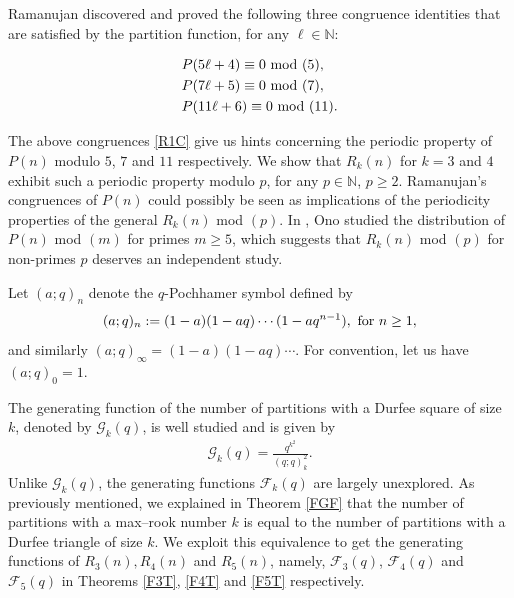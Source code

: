 \documentclass[12pt,reqno]{amsart}
\numberwithin{equation}{section}
\theoremstyle{plain}
\begin{document}
	
	Ramanujan discovered and proved the following three congruence identities that are satisfied by the partition function, for any $\ell \in \mathbb{N}$:

		\begin{equation} \label{R1C}
			\begin{split}
			&P(5\ell+4)\equiv 0 \textup{ mod (5)},\\
			&P(7\ell+5)\equiv 0 \textup{ mod (7)},\\
			&P(11\ell+6)\equiv 0 \textup{ mod (11)}.	
			\end{split}
		\end{equation}

	
	The above congruences \eqref{R1C} give us hints concerning the periodic property of $P(n)$ modulo $5$, $7$ and $11$ respectively. We show that $R_k(n)$ for $k=3$ and $4$ exhibit such a periodic property modulo $p$, for any $p\in \mathbb{N}$, $p\geq 2$. Ramanujan's congruences of $P(n)$ could possibly be seen as implications of the periodicity properties of the general $R_k(n)$ mod $(p)$. In \cite{ono2}, Ono studied the distribution of $P(n)$ mod $(m)$ for primes $m\geq5$, which suggests that $R_k(n)$ mod $(p)$ for non-primes $p$ deserves an independent study.
	
	Let $(a;q)_n$ denote the $q$-Pochhamer symbol defined by
		\begin{align*}
				(a;q)_n := (1-a)(1-aq) \cdots (1-aq^{n-1}), \textup{ for } n\geq 1, 
		\end{align*}
	and similarly $(a;q)_{\infty}= (1-a)(1-aq) \cdots$. For convention, let us have $(a;q)_0=1$. 
	
	The generating function of the number of partitions with a Durfee square of size $k$, denoted by $\mathscr{G}_k(q)$, is well studied \cite[p.28]{AndrewsBook} and is given by
	\begin{align} 
		\mathscr{G}_k(q)=\frac{q^{k^2}}{(q;q)_k^2}. \label{ScrGkGF}
	\end{align}
	Unlike $\mathscr{G}_k(q)$, the generating functions $\mathscr{F}_k(q)$ are largely unexplored.	As previously mentioned, we explained in Theorem \ref{FGF} that the number of partitions with a max--rook number $k$ is equal to the number of partitions with a Durfee triangle of size $k$. We exploit this equivalence to get the generating functions of $R_3(n), R_4(n)$ and $R_5(n)$, namely, $\mathscr{F}_3(q)$, $\mathscr{F}_4(q)$ and $\mathscr{F}_5(q)$ in Theorems \ref{F3T}, \ref{F4T} and \ref{F5T} respectively. 
\end{document}
